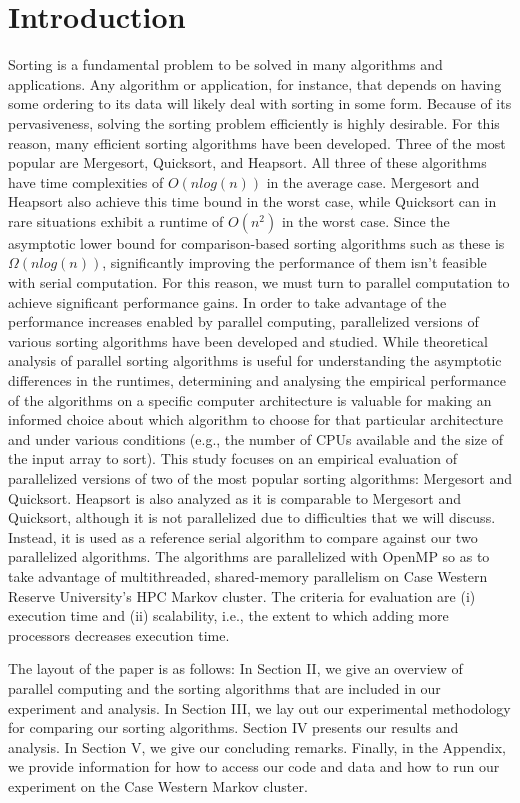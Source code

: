 \documentclass[conference]{IEEEtran}
\begin{document}
    \section{Introduction}
    Sorting is a fundamental problem to be solved in many algorithms and applications.
    Any algorithm or application, for instance, that depends on having some ordering to its data will likely deal with sorting in some form. Because of its pervasiveness, solving the sorting problem efficiently is highly desirable. For this reason, many efficient sorting algorithms have been developed. Three of the most popular are Mergesort, Quicksort, and Heapsort. All three of these algorithms have time complexities of $O(nlog(n))$ in the average case. Mergesort and Heapsort also achieve this time bound in the worst case, while Quicksort can in rare situations exhibit a runtime of $O(n^2)$ in the worst case. Since the asymptotic lower bound for comparison-based sorting algorithms such as these is $\Omega(nlog(n))$, significantly improving the performance of them isn't feasible with serial computation. For this reason, we must turn to parallel computation to achieve significant performance gains. In order to take advantage of the performance increases enabled by parallel computing, parallelized versions of various sorting algorithms have been developed and studied. While theoretical analysis of parallel sorting algorithms is useful for understanding the asymptotic differences in the runtimes, determining and analysing the empirical performance of the algorithms on a specific computer architecture is valuable for making an informed choice about which algorithm to choose for that particular architecture and under various conditions (e.g., the number of CPUs available and the size of the input array to sort).
    This study focuses on an empirical evaluation of parallelized versions of two of the most popular sorting algorithms: Mergesort and Quicksort. Heapsort is also analyzed as it is comparable to Mergesort and Quicksort, although it is not parallelized due to difficulties that we will discuss. Instead, it is used as a reference serial algorithm to compare against our two parallelized algorithms. The algorithms are parallelized with OpenMP so as to take advantage of multithreaded, shared-memory parallelism on Case Western Reserve University's HPC Markov cluster. The criteria for evaluation are (i) execution time and (ii) scalability, i.e., the extent to which adding more processors decreases execution time.

\indent The layout of the paper is as follows: In Section II, we give an overview of parallel computing and the sorting algorithms that are included in our experiment and analysis. In Section III, we lay out our experimental methodology for comparing our sorting algorithms. Section IV presents our results and analysis. In Section V, we give our concluding remarks. Finally, in the Appendix, we provide information for how to access our code and data and how to run our experiment on the Case Western Markov cluster. %
    
\end{document}
